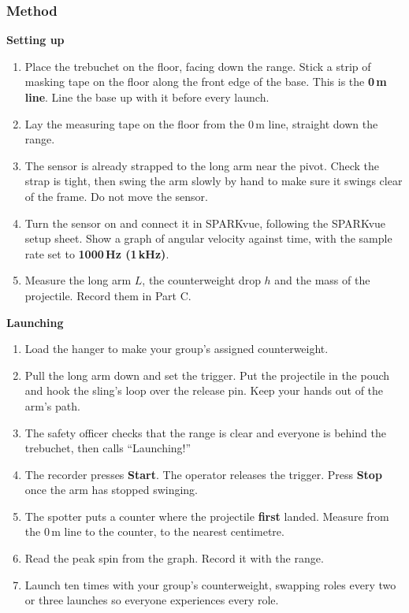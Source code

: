 \documentclass[11pt,a4paper]{article}
\begin{document}
\subsubsection*{Method}
\textbf{Setting up}
\begin{enumerate}[itemsep=1pt]
	\item Place the trebuchet on the floor, facing down the range. Stick a strip of masking tape on the floor along the front edge of the base. This is the \textbf{0\,m line}. Line the base up with it before every launch.
	\item Lay the measuring tape on the floor from the 0\,m line, straight down the range.
	\item The sensor is already strapped to the long arm near the pivot. Check the strap is tight, then swing the arm slowly by hand to make sure it swings clear of the frame. Do not move the sensor.
	\item Turn the sensor on and connect it in SPARKvue, following the SPARKvue setup sheet. Show a graph of angular velocity against time, with the sample rate set to \textbf{1000\,Hz (1\,kHz)}.
	\item Measure the long arm $L$, the counterweight drop $h$ and the mass of the projectile. Record them in Part C.
\end{enumerate}
\textbf{Launching}
\begin{enumerate}[itemsep=1pt, resume]
	\item Load the hanger to make your group's assigned counterweight.
	\item Pull the long arm down and set the trigger. Put the projectile in the pouch and hook the sling's loop over the release pin. Keep your hands out of the arm's path.
	\item The safety officer checks that the range is clear and everyone is behind the trebuchet, then calls ``Launching!''
	\item The recorder presses \textbf{Start}. The operator releases the trigger. Press \textbf{Stop} once the arm has stopped swinging.
	\item The spotter puts a counter where the projectile \textbf{first} landed. Measure from the 0\,m line to the counter, to the nearest centimetre.
	\item Read the peak spin from the graph. Record it with the range.
	\item Launch ten times with your group's counterweight, swapping roles every two or three launches so everyone experiences every role.
\end{enumerate}
\end{document}
